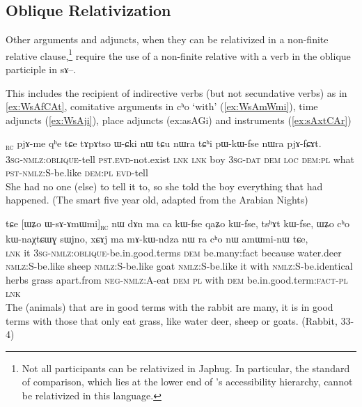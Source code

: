 \documentclass[oldfontcommands,oneside,a4paper,11pt]{article}
\newcommand{\ipa}[1]{{\phon #1}} %
\newcommand{\topic}{\textsc{dem}}
\newcommand{\rc}{\textsubscript{\textsc{rc}}}
\begin{document}
\subsection{Oblique Relativization}
Other arguments and adjuncts, when they can be relativized in a non-finite relative clause,\footnote{Not all participants can be relativized in Japhug. In particular, the standard of comparison, which lies at the lower end of \citet{keenan77accessibility}'s accessibility hierarchy, cannot be relativized in this language.} require the use of a non-finite relative with a verb in the oblique participle in \ipa{sɤ--}.

This includes the recipient of indirective verbs (but not secundative verbs) as in \ref{ex:WsAfCAt}, comitative arguments in \ipa{cʰo} `with' (\ref{ex:WsAmWmi}), time adjuncts (\ref{ex:WsAji}), place adjuncts ({ex:asAGi}) and instruments (\ref{ex:sAxtCAr})

\begin{exe}
\ex \label{ex:WsAfCAt}
\gll
[\ipa{ɯ-sɤ-fɕɤt}]\rc{} 
\ipa{pjɤ-me} 	\ipa{qʰe} 	\ipa{tɕe} 	\ipa{tɤpɤtso} 	\ipa{ɯ-ɕki} 	\ipa{nɯ} 	\ipa{tɕu} 	\ipa{nɯra} 	\ipa{tɕʰi} 	\ipa{pɯ-kɯ-fse} 	\ipa{nɯra} 	\ipa{pjɤ-fɕɤt.} \\
\textsc{3sg-nmlz:oblique}-tell \textsc{pst.evd}-not.exist \textsc{lnk} \textsc{lnk} boy \textsc{3sg-dat} \textsc{dem} \textsc{loc} \textsc{dem:pl} what \textsc{pst-nmlz:S}-be.like  \textsc{dem:pl} \textsc{evd}-tell \\
\glt She had no one (else) to tell it to, so she told the boy everything that had happened. (The smart five year old, adapted from the Arabian Nights)
\end{exe} 

\begin{exe}
   \ex \label{ex:WsAmWmi}
 \gll 
\ipa{tɕe}   	[\ipa{ɯʑo}   	\ipa{ɯ-sɤ-ɤmɯmi}]\rc{}   	\ipa{nɯ}   	\ipa{dɤn}   	\ipa{ma}   	\ipa{ca}   	\ipa{kɯ-fse}   	\ipa{qaʑo}   	\ipa{kɯ-fse,}   	\ipa{tsʰɤt}   	\ipa{kɯ-fse,}   	 \ipa{ɯʑo}   	\ipa{cʰo}   	\ipa{kɯ-naχtɕɯɣ}   	\ipa{sɯjno,}   	\ipa{xɕɤj}   	\ipa{ma}   	\ipa{mɤ-kɯ-ndza}   	\ipa{nɯ} \ipa{ra}   	\ipa{cʰo}   	\ipa{nɯ}   	\ipa{amɯmi-nɯ}   	\ipa{tɕe,}   \\
\textsc{lnk} it \textsc{3sg-nmlz:oblique}-be.in.good.terms \topic{} be.many:{fact} because water.deer \textsc{nmlz:S}-be.like sheep \textsc{nmlz:S}-be.like goat  \textsc{nmlz:S}-be.like it with  \textsc{nmlz:S}-be.identical herbs grass apart.from \textsc{neg-nmlz:A}-eat \textsc{dem} \textsc{pl} with \textsc{dem} be.in.good.term:\textsc{fact}-\textsc{pl} \textsc{lnk} \\
\glt The (animals) that are in good terms with the rabbit are many, it is in good terms with those that only eat grass, like water deer, sheep or goats. (Rabbit, 33-4)
\end{exe}
\end{document}
